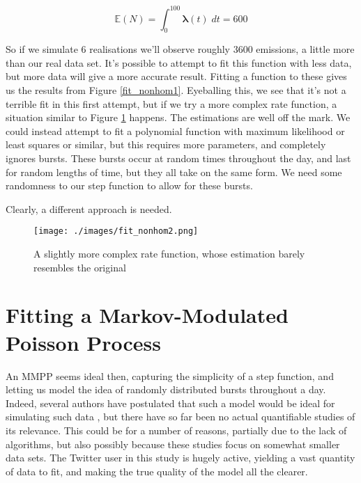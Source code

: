 $$
\mathbb{E}(N) = \int^{100}_0 \bm{\lambda}(t) \; dt = 600
$$

So if we simulate 6 realisations we'll observe roughly $3600$ emissions, a little more than our real data set. It's possible to attempt to fit this function with less data, but more data will give a more accurate result. Fitting a function to these gives us the results from Figure \ref{fit_nonhom1}. Eyeballing this, we see that it's not a terrible fit in this first attempt, but if we try a more complex rate function, a situation similar to Figure \ref{fit_nonhom2} happens. The estimations are well off the mark. We could instead attempt to fit a polynomial function with maximum likelihood or least squares or similar, but this requires more parameters, and completely ignores bursts. These bursts occur at random times throughout the day, and last for random lengths of time, but they all take on the same form. We need some randomness to our step function to allow for these bursts.

Clearly, a different approach is needed.

\begin{figure}[h]
\centering
\texttt{[image: ./images/fit\_nonhom2.png]}
\caption{A slightly more complex rate function, whose estimation barely resembles the original}
\label{fit_nonhom2}
\end{figure}

\clearpage

\section{Fitting a Markov-Modulated Poisson Process}

An MMPP seems ideal then, capturing the simplicity of a step function, and letting us model the idea of randomly distributed bursts throughout a day. Indeed, several authors have postulated that such a model would be ideal for simulating such data \cite{mmpp1}\cite{mmpp2}\cite{mmpp3}, but there have so far been no actual quantifiable studies of its relevance. This could be for a number of reasons, partially due to the lack of algorithms, but also possibly because these studies focus on somewhat smaller data sets. The Twitter user in this study is hugely active, yielding a vast quantity of data to fit, and making the true quality of the model all the clearer.

